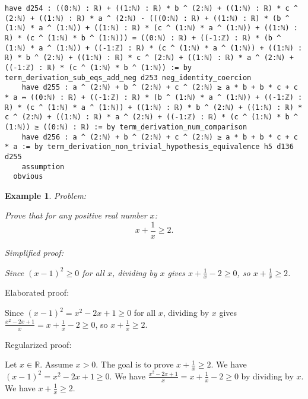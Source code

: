 \documentclass{article}
\newtheorem{example}{Example}
\begin{document}
\begin{tcolorbox}[colback=white!10, width=\linewidth]
\begin{lstlisting}[language=Lean4]
    have d254 : ((0:ℕ) : ℝ) + ((1:ℕ) : ℝ) * b ^ (2:ℕ) + ((1:ℕ) : ℝ) * c ^ (2:ℕ) + ((1:ℕ) : ℝ) * a ^ (2:ℕ) - (((0:ℕ) : ℝ) + ((1:ℕ) : ℝ) * (b ^ (1:ℕ) * a ^ (1:ℕ)) + ((1:ℕ) : ℝ) * (c ^ (1:ℕ) * a ^ (1:ℕ)) + ((1:ℕ) : ℝ) * (c ^ (1:ℕ) * b ^ (1:ℕ))) = ((0:ℕ) : ℝ) + ((-1:ℤ) : ℝ) * (b ^ (1:ℕ) * a ^ (1:ℕ)) + ((-1:ℤ) : ℝ) * (c ^ (1:ℕ) * a ^ (1:ℕ)) + ((1:ℕ) : ℝ) * b ^ (2:ℕ) + ((1:ℕ) : ℝ) * c ^ (2:ℕ) + ((1:ℕ) : ℝ) * a ^ (2:ℕ) + ((-1:ℤ) : ℝ) * (c ^ (1:ℕ) * b ^ (1:ℕ)) := by term_derivation_sub_eqs_add_neg d253 neg_identity_coercion
    have d255 : a ^ (2:ℕ) + b ^ (2:ℕ) + c ^ (2:ℕ) ≥ a * b + b * c + c * a ↔ ((0:ℕ) : ℝ) + ((-1:ℤ) : ℝ) * (b ^ (1:ℕ) * a ^ (1:ℕ)) + ((-1:ℤ) : ℝ) * (c ^ (1:ℕ) * a ^ (1:ℕ)) + ((1:ℕ) : ℝ) * b ^ (2:ℕ) + ((1:ℕ) : ℝ) * c ^ (2:ℕ) + ((1:ℕ) : ℝ) * a ^ (2:ℕ) + ((-1:ℤ) : ℝ) * (c ^ (1:ℕ) * b ^ (1:ℕ)) ≥ ((0:ℕ) : ℝ) := by term_derivation_num_comparison
    have d256 : a ^ (2:ℕ) + b ^ (2:ℕ) + c ^ (2:ℕ) ≥ a * b + b * c + c * a := by term_derivation_non_trivial_hypothesis_equivalence h5 d136 d255
    assumption
  obvious

\end{lstlisting}
\end{tcolorbox}


\begin{example}
Problem:
\begin{tcolorbox}[colback=yellow!10, width=\linewidth]
Prove that for any positive real number $x$:
    $$x + \frac{1}{x} \geq 2.$$
\end{tcolorbox}

Simplified proof:
\begin{tcolorbox}[colback=blue!10, width=\linewidth]
Since $(x-1)^2 \ge 0$ for all $x$, dividing by $x$ gives $x + \frac{1}{x} - 2 \ge 0$, so $x + \frac{1}{x} \ge 2$.
\end{tcolorbox}
\end{example}

Elaborated proof:
\begin{tcolorbox}[colback=green!10, width=\linewidth]
Since $(x-1)^2 = x^2 - 2x + 1 \ge 0$ for all $x$, dividing by $x$ gives $\frac{x^2 - 2x + 1}{x} = x + \frac{1}{x} - 2 \ge 0$, so $x + \frac{1}{x} \ge 2$.
\end{tcolorbox}

Regularized proof:
\begin{tcolorbox}[colback=red!10, width=\linewidth]
Let $x\in\mathbb{R}$. Assume $x>0$.
The goal is to prove $x + \frac{1}{x} \ge 2$.
We have ${\left(x-1\right)}^2 = x^2 - 2x + 1 \ge 0$.
We have $\frac{x^2 - 2x + 1}{x} = x + \frac{1}{x} - 2 \ge 0$ by dividing by $x$.
We have $x + \frac{1}{x} \ge 2$.
\end{tcolorbox}
\end{document}
